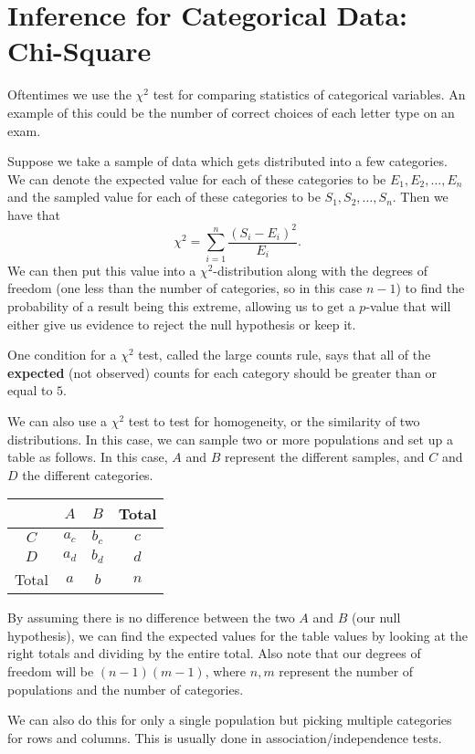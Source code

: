 \section{Inference for Categorical Data: Chi-Square}

Oftentimes we use the \( \chi^2 \) test for comparing statistics of categorical
variables. An example of this could be the number of correct choices of each
letter type on an exam.

Suppose we take a sample of data which gets distributed into a few
categories. We can denote the expected value for each of these categories to be
\( E_1,E_2,\ldots,E_n \) and the sampled value for each of these categories to
be \( S_1,S_2,\ldots,S_n \). Then we have that
\[
    \chi^2 = \sum_{i = 1}^n \frac{\left( S_i - E_i \right)^2}{E_i}
.\]
We can then put this value into a \( \chi^2 \)-distribution along with the
degrees of freedom (one less than the number of categories, so in this case \(
n - 1 \)) to find the probability of a result being this extreme, allowing us
to get a \( p \)-value that will either give us evidence to reject the null
hypothesis or keep it.

One condition for a \( \chi^2 \) test, called the large counts rule, says that
all of the \textbf{expected} (not observed) counts for each category should be
greater than or equal to \( 5 \).

We can also use a \( \chi^2 \) test to test for homogeneity, or the similarity
of two distributions. In this case, we can sample two or more populations and
set up a table as follows. In this case, \( A \) and \( B \) represent the different samples, and \( C \) and \( D \) the different categories.

\begin{center}
    \begin{tabular}{c|c|c|c}
        & \( A \) & \( B \) & Total \\
        \hline \( C \) & \( a_c \) & \( b_c \) & \( c \) \\
        \hline \( D \) & \( a_d \) & \( b_d \) &  \( d \) \\
        \hline Total & \( a \) & \( b \) & \( n \)
    \end{tabular}
\end{center}

By assuming there is no difference between the two \( A \) and \( B \) (our
null hypothesis), we can find the expected values for the table values by
looking at the right totals and dividing by the entire total. Also note that
our degrees of freedom will be \( \left( n - 1 \right) \left( m - 1 \right) \),
where \( n,m \) represent the number of populations and the number of
categories.

We can also do this for only a single population but picking multiple
categories for rows and columns. This is usually done in
association/independence tests.
